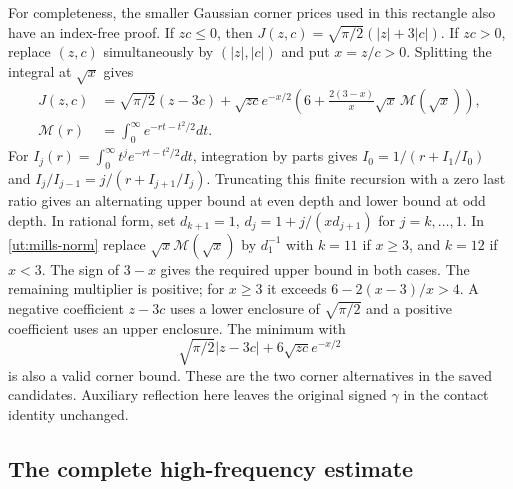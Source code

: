 \documentclass[aop,preprint]{imsart}
\theoremstyle{definition}
\numberwithin{equation}{section}
\begin{document}
For completeness, the smaller Gaussian corner prices used in this
rectangle also have an index-free proof. If $zc\le0$, then
$J(z,c)=\sqrt{\pi/2}(|z|+3|c|)$.
If $zc>0$, replace $(z,c)$ simultaneously by $(|z|,|c|)$ and put
$x=z/c>0$. Splitting the integral at $\sqrt x$ gives
\begin{equation}\label{ut:mills-norm}
\begin{aligned}
 J(z,c)&=\sqrt{\pi/2}(z-3c)+\sqrt{zc}e^{-x/2}
       \left(6+\frac{2(3-x)}x\sqrt x\,\mathcal M(\sqrt x)\right),\\
 \mathcal M(r)&=\int_0^\infty e^{-rt-t^2/2}dt.
\end{aligned}
\end{equation}
For $I_j(r)=\int_0^\infty t^je^{-rt-t^2/2}dt$, integration by parts
gives $I_0=1/(r+I_1/I_0)$ and
$I_j/I_{j-1}=j/(r+I_{j+1}/I_j)$.
Truncating this finite recursion with a zero last ratio gives an
alternating upper bound at even depth and lower bound at odd depth.
In rational form, set $d_{k+1}=1$,
$d_j=1+j/(xd_{j+1})$ for $j=k,\ldots,1$.
In \eqref{ut:mills-norm} replace
$\sqrt x\mathcal M(\sqrt x)$ by $d_1^{-1}$ with $k=11$ if
$x\ge3$, and $k=12$ if $x<3$.
The sign of $3-x$ gives the required upper bound in both cases.
The remaining multiplier is positive; for $x\ge3$ it exceeds
$6-2(x-3)/x>4$.
A negative coefficient $z-3c$ uses a lower enclosure of
$\sqrt{\pi/2}$ and a positive coefficient uses an upper enclosure.
The minimum with
\[
 \sqrt{\pi/2}|z-3c|+6\sqrt{zc}e^{-x/2}
\]
is also a valid corner bound. These are the two corner alternatives
in the saved candidates. Auxiliary reflection here leaves the original
signed $\gamma$ in the contact identity unchanged.

\subsection{The complete high-frequency estimate}
\end{document}
